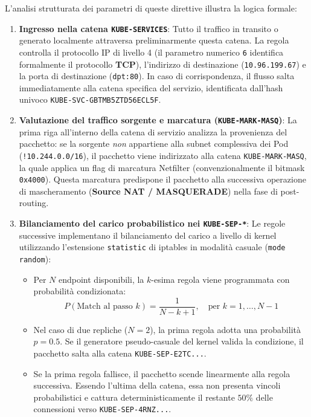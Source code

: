 \documentclass[11pt, a4paper]{article}
\begin{document}
L'analisi strutturata dei parametri di queste direttive illustra la logica formale:
\begin{enumerate}
    \item \textbf{Ingresso nella catena \texttt{KUBE-SERVICES}}:
    Tutto il traffico in transito o generato localmente attraversa preliminarmente questa catena. La regola controlla il protocollo IP di livello 4 (il parametro numerico \texttt{6} identifica formalmente il protocollo \textbf{TCP}), l'indirizzo di destinazione (\texttt{10.96.199.67}) e la porta di destinazione (\texttt{dpt:80}). In caso di corrispondenza, il flusso salta immediatamente alla catena specifica del servizio, identificata dall'hash univoco \texttt{KUBE-SVC-GBTMB5ZTD56ECL5F}.

    \item \textbf{Valutazione del traffico sorgente e marcatura (\texttt{KUBE-MARK-MASQ})}:
    La prima riga all'interno della catena di servizio analizza la provenienza del pacchetto: se la sorgente \emph{non} appartiene alla subnet complessiva dei Pod (\texttt{!10.244.0.0/16}), il pacchetto viene indirizzato alla catena \texttt{KUBE-MARK-MASQ}, la quale applica un flag di marcatura Netfilter (convenzionalmente il bitmask \texttt{0x4000}). Questa marcatura predispone il pacchetto alla successiva operazione di mascheramento (\textbf{Source NAT / MASQUERADE}) nella fase di post-routing.

    \item \textbf{Bilanciamento del carico probabilistico nei \texttt{KUBE-SEP-*}}:
    Le regole successive implementano il bilanciamento del carico a livello di kernel utilizzando l'estensione \texttt{statistic} di iptables in modalità casuale (\texttt{mode random}):
    \begin{itemize}[noitemsep]
        \item Per $N$ endpoint disponibili, la $k$-esima regola viene programmata con probabilità condizionata:
        \[
            P(\text{Match al passo } k) = \frac{1}{N - k + 1}, \quad \text{per } k = 1, \dots, N-1
        \]
        \item Nel caso di due repliche ($N=2$), la prima regola adotta una probabilità $p = 0.5$. Se il generatore pseudo-casuale del kernel valida la condizione, il pacchetto salta alla catena \texttt{KUBE-SEP-E2TC...}.
        \item Se la prima regola fallisce, il pacchetto scende linearmente alla regola successiva. Essendo l'ultima della catena, essa non presenta vincoli probabilistici e cattura deterministicamente il restante $50\%$ delle connessioni verso \texttt{KUBE-SEP-4RNZ...}.
    \end{itemize}


\end{enumerate}
\end{document}
